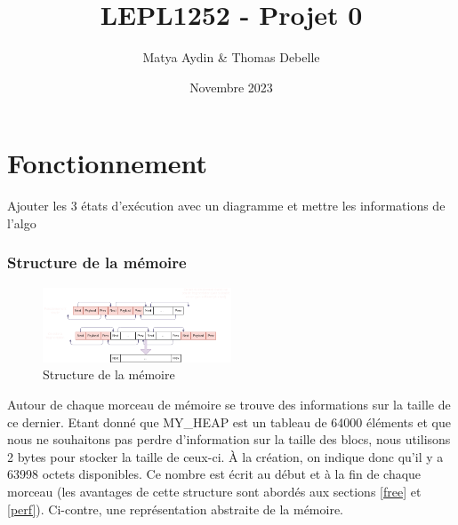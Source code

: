 \documentclass{article}
\title{LEPL1252 - Projet 0}
\author{Matya Aydin \& Thomas Debelle}
\date{Novembre 2023}
\begin{document}
\maketitle

\section{Fonctionnement}


Ajouter les 3 états d'exécution avec un diagramme et mettre les informations de l'algo

\subsubsection{Structure de la mémoire}

\begin{figure}
    \centering
    \includegraphics[width=0.5\textwidth, trim = {0 1.6cm 0 1.5cm}, clip]{fonctionnement.png}
    \caption{Structure de la mémoire}
    \label{fct}

\end{figure}

Autour de chaque morceau de mémoire se trouve des informations sur la taille de ce dernier.
Etant donné que MY\_HEAP est un tableau de 64000 éléments et que nous ne souhaitons pas perdre d'information sur la taille des blocs, nous utilisons 2 bytes pour stocker la taille de ceux-ci.
À la création, on indique donc qu'il y a 63998 octets disponibles. Ce nombre est écrit au début et à la fin de chaque morceau (les avantages de cette structure sont abordés aux sections \ref{free} et \ref{perf}). Ci-contre, une représentation abstraite de la mémoire.
\end{document}
